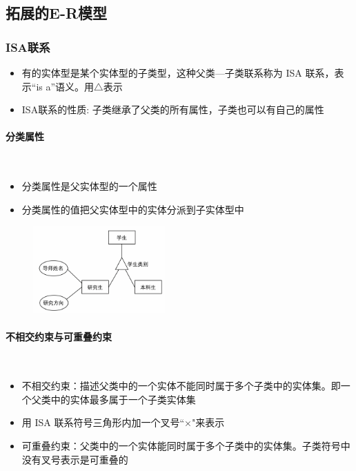 \subsection{拓展的E-R模型}

\subsubsection{ISA联系}
\begin{itemize}
    \item 有的实体型是某个实体型的子类型，这种父类—子类联系称为 ISA 联系，表示“is a”语义。用$\triangle$表示
    \item ISA联系的性质: 子类继承了父类的所有属性，子类也可以有自己的属性
\end{itemize}

\paragraph*{分类属性}~{}

\begin{itemize}
    \item 分类属性是父实体型的一个属性
    \item 分类属性的值把父实体型中的实体分派到子实体型中 
\end{itemize}

\begin{figure}[H]
    \vspace{-0.5em}
	\centering
	\includegraphics[width=0.45\textwidth]{images/7.12}
    \vspace{-1em}
\end{figure}

\paragraph*{不相交约束与可重叠约束}~{}

\begin{itemize}
    \item 不相交约束：描述父类中的一个实体不能同时属于多个子类中的实体集。即一个父类中的实体最多属于一个子类实体集
    \item 用 ISA 联系符号三角形内加一个叉号“$\times$"来表示
    \item 可重叠约束：父类中的一个实体能同时属于多个子类中的实体集。子类符号中没有叉号表示是可重叠的
\end{itemize}

